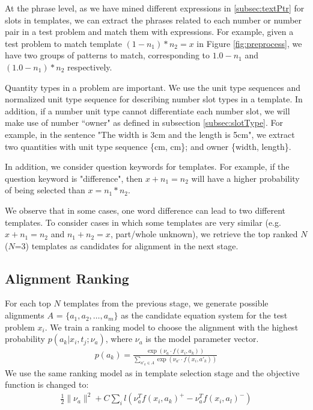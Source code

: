 \documentclass[11pt,letterpaper]{article}
\begin{document}
At the phrase level, as we have mined different expressions in \ref{subsec:textPtr} for slots in templates, we can extract the phrases related to each number or number pair in a test problem and match them with expressions. For example, given a test problem to match template $(1-n_{1})*n_{2}=x$ in Figure \ref{fig:preprocess}, we have two groups of patterns to match, corresponding to $1.0-n_{1}$ and $(1.0-n_{1})*n_{2}$ respectively.

Quantity types in a problem are important. We use the unit type sequences and normalized unit type sequence for describing number slot types in a template. In addition, if a number unit type cannot differentiate each number slot, we will make use of number ``owner" as defined in subsection \ref{subsec:slotType}. For example, in the sentence "The width is 3cm and the length is 5cm", we extract two quantities with unit type sequence \{cm, cm\}; and owner \{width, length\}.

In addition, we consider question keywords for templates. For example, if the question keyword is "difference", then $x+n_{1}=n_{2}$ will have a higher probability of being selected than $x=n_{1}*n_{2}$.

We observe that in some cases, one word difference can lead to two different templates. To consider cases in which some templates are very similar (e.g. $x+n_1=n_2$ and $n_1+n_2=x$, part/whole unknown), we retrieve the top ranked $N$ ($N$=3) templates as candidates for alignment in the next stage.

\subsection{Alignment Ranking}

For each top $N$ templates from the previous stage, we generate possible alignments $A$ = $\{a_{1},a_{2},\dots,a_{m}\}$ as the candidate equation system for the test problem $x_{i}$. We train a ranking model to choose the alignment with the highest probability $p(a_{k}|x_{i},t_{j};\nu_{a})$, where $\nu_{a}$ is the model parameter vector.\\
\begin{gather*}
p(a_{k})=\frac{\exp(\nu_{a} \cdot f(x_{i},a_{k}))} {\sum_{a'_{k}\in A} \exp(\nu_{a'} \cdot f(x_{i},a'_{k}))}
\end{gather*}
We use the same ranking model as in template selection stage and the objective function is changed to:
\begin{gather*}
\frac{1}{2}\|\nu_{a}\|^2 + C \sum_{i} l(\nu_{a}^T f(x_{i},a_{k})^+-\nu_{a}^T f(x_{i},a_{l})^-)
\end{gather*}
\end{document}
